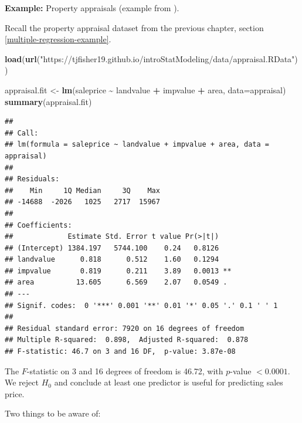 \documentclass[
]{book}
\newenvironment{Shaded}{\begin{snugshade}}{\end{snugshade}}
\newcommand{\AttributeTok}[1]{\textcolor[rgb]{0.13,0.29,0.53}{#1}}
\newcommand{\FunctionTok}[1]{\textcolor[rgb]{0.13,0.29,0.53}{\textbf{#1}}}
\newcommand{\NormalTok}[1]{#1}
\newcommand{\OtherTok}[1]{\textcolor[rgb]{0.56,0.35,0.01}{#1}}
\newcommand{\SpecialCharTok}[1]{\textcolor[rgb]{0.81,0.36,0.00}{\textbf{#1}}}
\newcommand{\StringTok}[1]{\textcolor[rgb]{0.31,0.60,0.02}{#1}}
\begin{document}
\textbf{Example:} Property appraisals (example from \citet{McClaveSincich2008}).

Recall the property appraisal dataset from the previous chapter, section \ref{multiple-regression-example}.

\begin{Shaded}
\begin{Highlighting}[]
\FunctionTok{load}\NormalTok{(}\FunctionTok{url}\NormalTok{(}\StringTok{"https://tjfisher19.github.io/introStatModeling/data/appraisal.RData"}\NormalTok{))}
\end{Highlighting}
\end{Shaded}

\begin{Shaded}
\begin{Highlighting}[]
\NormalTok{appraisal.fit }\OtherTok{\textless{}{-}} \FunctionTok{lm}\NormalTok{(saleprice }\SpecialCharTok{\textasciitilde{}}\NormalTok{ landvalue }\SpecialCharTok{+}\NormalTok{ impvalue }\SpecialCharTok{+}\NormalTok{ area, }\AttributeTok{data=}\NormalTok{appraisal)}
\FunctionTok{summary}\NormalTok{(appraisal.fit)}
\end{Highlighting}
\end{Shaded}

\begin{verbatim}
## 
## Call:
## lm(formula = saleprice ~ landvalue + impvalue + area, data = appraisal)
## 
## Residuals:
##    Min     1Q Median     3Q    Max 
## -14688  -2026   1025   2717  15967 
## 
## Coefficients:
##             Estimate Std. Error t value Pr(>|t|)   
## (Intercept) 1384.197   5744.100    0.24   0.8126   
## landvalue      0.818      0.512    1.60   0.1294   
## impvalue       0.819      0.211    3.89   0.0013 **
## area          13.605      6.569    2.07   0.0549 . 
## ---
## Signif. codes:  0 '***' 0.001 '**' 0.01 '*' 0.05 '.' 0.1 ' ' 1
## 
## Residual standard error: 7920 on 16 degrees of freedom
## Multiple R-squared:  0.898,  Adjusted R-squared:  0.878 
## F-statistic: 46.7 on 3 and 16 DF,  p-value: 3.87e-08
\end{verbatim}

The \(F\)-statistic on 3 and 16 degrees of freedom is 46.72, with \(p\)-value \(< 0.0001\). We reject \(H_0\) and conclude at least one predictor is useful for predicting sales price.

Two things to be aware of:
\end{document}
